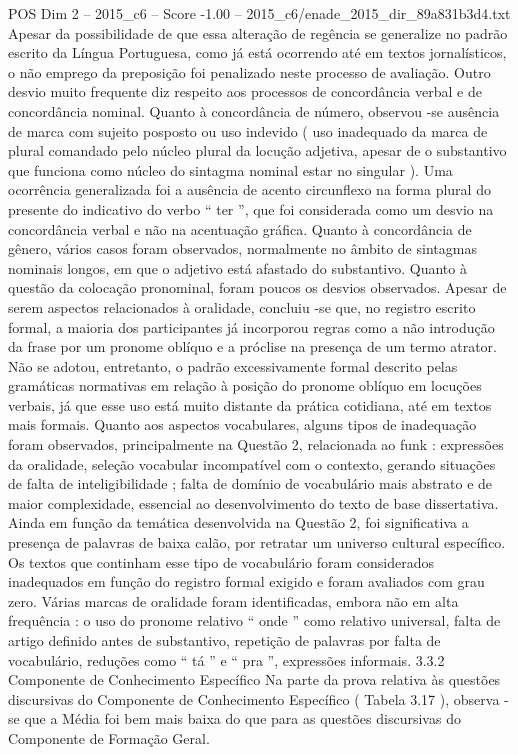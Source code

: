 \begin{textsample}{POS Dim 2 – 2015\_c6 – Score -1.00 – 2015\_c6/enade\_2015\_dir\_89a831b3d4.txt}
Apesar da possibilidade de que essa alteração de regência se generalize no padrão escrito da Língua Portuguesa, como já está ocorrendo até em textos jornalísticos, o não emprego da preposição foi penalizado neste processo de avaliação.
Outro desvio muito frequente diz respeito aos processos de concordância verbal e de concordância nominal.
Quanto à concordância de número, observou -se ausência de marca com sujeito posposto ou uso indevido ( uso inadequado da marca de plural comandado pelo núcleo plural da locução adjetiva, apesar de o substantivo que funciona como núcleo do sintagma nominal estar no singular ).
Uma ocorrência generalizada foi a ausência de acento circunflexo na forma plural do presente do indicativo do verbo “ ter ”, que foi considerada como um desvio na concordância verbal e não na acentuação gráfica.
Quanto à concordância de gênero, vários casos foram observados, normalmente no âmbito de sintagmas nominais longos, em que o adjetivo está afastado do substantivo.
Quanto à questão da colocação pronominal, foram poucos os desvios observados.
Apesar de serem aspectos relacionados à oralidade, concluiu -se que, no registro escrito formal, a maioria dos participantes já incorporou regras como a não introdução da frase por um pronome oblíquo e a próclise na presença de um termo atrator.
Não se adotou, entretanto, o padrão excessivamente formal descrito pelas gramáticas normativas em relação à posição do pronome oblíquo em locuções verbais, já que esse uso está muito distante da prática cotidiana, até em textos mais formais.
Quanto aos aspectos vocabulares, alguns tipos de inadequação foram observados, principalmente na Questão 2, relacionada ao funk : expressões da oralidade, seleção vocabular incompatível com o contexto, gerando situações de falta de inteligibilidade ; falta de domínio de vocabulário mais abstrato e de maior complexidade, essencial ao desenvolvimento do texto de base dissertativa.
Ainda em função da temática desenvolvida na Questão 2, foi significativa a presença de palavras de baixa calão, por retratar um universo cultural específico.
Os textos que continham esse tipo de vocabulário foram considerados inadequados em função do registro formal exigido e foram avaliados com grau zero.
Várias marcas de oralidade foram identificadas, embora não em alta frequência : o uso do pronome relativo “ onde ” como relativo universal, falta de artigo definido antes de substantivo, repetição de palavras por falta de vocabulário, reduções como “ tá ” e “ pra ”, expressões informais. 3.3.2 Componente de Conhecimento Específico Na parte da prova relativa às questões discursivas do Componente de Conhecimento Específico ( Tabela 3.17 ), observa -se que a Média foi bem mais baixa do que para as questões discursivas do Componente de Formação Geral.

\end{textsample}
